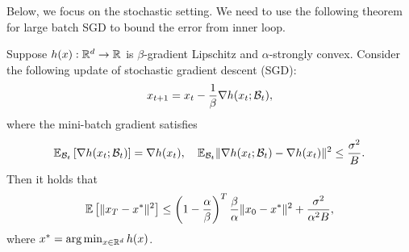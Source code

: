 Below, we focus on the stochastic setting. We need to use the following theorem for large batch SGD to bound the error from inner loop.

\begin{thm}
\label{thm:SGD-SC}
Suppose $h(x): {\mathbb{R}}^d \rightarrow {\mathbb{R}}$ is  $\beta$-gradient Lipschitz and $\alpha$-strongly convex. Consider the following update of stochastic gradient descent (SGD):
\begin{align*}
    x_{t+1} = x_t - \frac{1}{\beta} \nabla h(x_t;{\mathcal{B}}_t),
\end{align*}
where the mini-batch gradient satisfies 
\begin{align*}
    {\mathbb{E}}_{{\mathcal{B}}_t} \left[ \nabla h(x_t;{\mathcal{B}}_t) \right] = \nabla h(x_t) , \quad {\mathbb{E}}_{{\mathcal{B}}_t} \Vert \nabla h(x_t;{\mathcal{B}}_t) - \nabla h(x_t) \Vert^2 \le \frac{\sigma^2}{B}.
\end{align*}
Then it holds that
\begin{align*}
    {\mathbb{E}} \left[ \Vert x_T - x^* \Vert^2 \right] \le \left(1 - \frac{\alpha}{\beta} \right)^T \frac{\beta}{\alpha} \Vert x_0 - x^* \Vert^2 + \frac{\sigma^2}{\alpha^2 B},
\end{align*}
where $x^* = \arg \min_{x \in {\mathbb{R}}^d} h(x)$.
\end{thm} 

